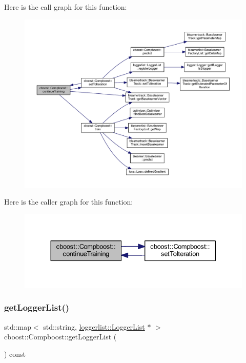 Here is the call graph for this function\+:\nopagebreak
\begin{figure}[H]
\begin{center}
\leavevmode
\includegraphics[width=350pt]{classcboost_1_1_compboost_a191aa22dbfcc3d2e878ef75c0b196d07_cgraph}
\end{center}
\end{figure}
Here is the caller graph for this function\+:\nopagebreak
\begin{figure}[H]
\begin{center}
\leavevmode
\includegraphics[width=330pt]{classcboost_1_1_compboost_a191aa22dbfcc3d2e878ef75c0b196d07_icgraph}
\end{center}
\end{figure}
\mbox{\label{classcboost_1_1_compboost_a0376256bdfde1a50b420ad7412f4b4dd}} 
\subsubsection{\texorpdfstring{get\+Logger\+List()}{getLoggerList()}}
{\footnotesize\ttfamily std\+::map$<$ std\+::string, \mbox{\hyperlink{classloggerlist_1_1_logger_list}{loggerlist\+::\+Logger\+List}} $\ast$ $>$ cboost\+::\+Compboost\+::get\+Logger\+List (\begin{DoxyParamCaption}{ }\end{DoxyParamCaption}) const}

